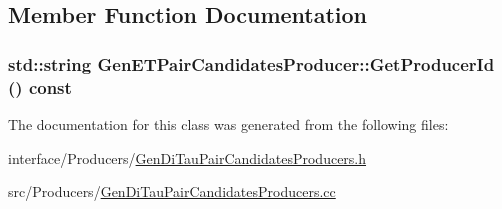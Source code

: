 \subsection{Member Function Documentation}
\hypertarget{classGenETPairCandidatesProducer_a6c2e608601f25fcdf504e8353c870db4}{
\subsubsection[{GetProducerId}]{\setlength{\rightskip}{0pt plus 5cm}std::string GenETPairCandidatesProducer::GetProducerId () const}}
\label{classGenETPairCandidatesProducer_a6c2e608601f25fcdf504e8353c870db4}


The documentation for this class was generated from the following files:\begin{DoxyCompactItemize}
\item 
interface/Producers/\hyperlink{GenDiTauPairCandidatesProducers_8h}{GenDiTauPairCandidatesProducers.h}\item 
src/Producers/\hyperlink{GenDiTauPairCandidatesProducers_8cc}{GenDiTauPairCandidatesProducers.cc}\end{DoxyCompactItemize}
